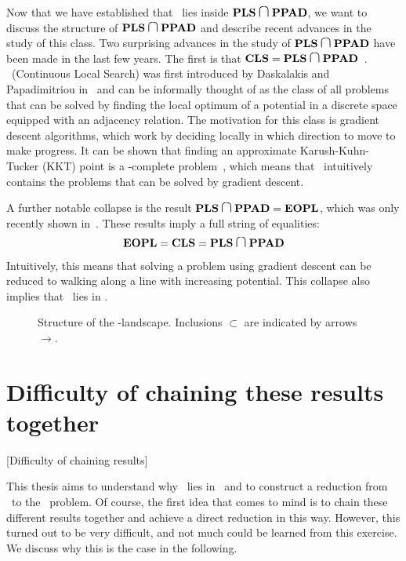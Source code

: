 Now that we have established that \Tarski\ lies inside $\PLS \medcap \PPAD$, we want to discuss the structure of $\PLS \medcap \PPAD$ and describe recent advances in the study of this class. Two surprising advances in the study of $\PLS \medcap \PPAD$ have been made in the last few years. The first is that $\CLS = \PLS \medcap \PPAD$~. \CLS\ (Continuous Local Search) was first introduced by Daskalakis and Papadimitriou in~ and can be informally thought of as the class of all problems that can be solved by finding the local optimum of a potential in a discrete space equipped with an adjacency relation. The motivation for this class is gradient descent algorithms, which work by deciding locally in which direction to move to make progress. It can be shown that finding an approximate Karush-Kuhn-Tucker (KKT) point is a \CLS-complete problem~\cite{daskalakis_continuous_2011}, which means that \CLS\ intuitively contains the problems that can be solved by gradient descent.

A further notable collapse is the result $\PLS \medcap \PPAD = \EOPL$, which was only recently shown in~. These results imply a full string of equalities:
\begin{align*}
	\EOPL = \CLS = \PLS \medcap \PPAD
\end{align*}
Intuitively, this means that solving a problem using gradient descent can be reduced to walking along a line with increasing potential. This collapse also implies that \Tarski\ lies in \EOPL\@.

\begin{figure*}
	\centering
	\large
	\caption[\TFNP-landscape]{Structure of the \TFNP-landscape. Inclusions $\subset$ are indicated by arrows $\rightarrow$.}\label{fig:tfnp_structure}
\end{figure*}

\section{Difficulty of chaining these results together}[Difficulty of chaining results]

This thesis aims to understand why \Tarski\ lies in \EOPL\ and to construct a reduction from \Tarski\ to the \EndOfPotentialLine\ problem. Of course, the first idea that comes to mind is to chain these different results together and achieve a direct reduction in this way. However, this turned out to be very difficult, and not much could be learned from this exercise. We discuss why this is the case in the following.

